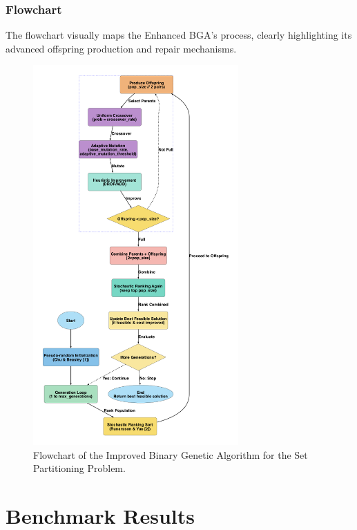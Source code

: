 \documentclass[12pt]{article}
\begin{document}
\subsubsection{Flowchart}
The flowchart visually maps the Enhanced BGA’s process, clearly highlighting its advanced offspring production and repair mechanisms.
\begin{figure}[htbp]
  \centering
  \includegraphics[width=0.70\textwidth]{improved_bga_flowchart.png}
  \caption{Flowchart of the Improved Binary Genetic Algorithm for the Set Partitioning Problem.}
  \label{fig:flowchart3}
\end{figure}

\newpage

\section{Benchmark Results}
\label{sec:results}
\end{document}
